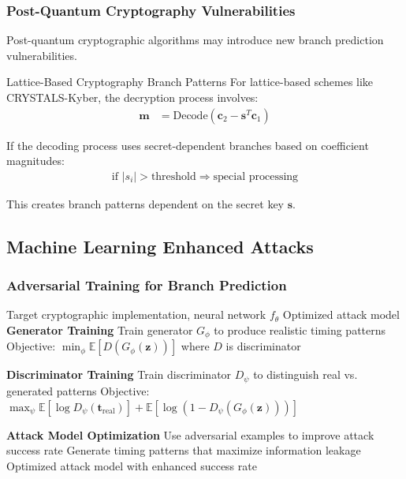 \documentclass[11pt,a4paper]{article}
\theoremstyle{definition}
\begin{document}
\subsubsection{Post-Quantum Cryptography Vulnerabilities}

Post-quantum cryptographic algorithms may introduce new branch prediction vulnerabilities.

\begin{mathematicsbox}{Lattice-Based Cryptography Branch Patterns}
For lattice-based schemes like CRYSTALS-Kyber, the decryption process involves:
\begin{align}
\mathbf{m} &= \text{Decode}(\mathbf{c}_2 - \mathbf{s}^T \mathbf{c}_1)
\end{align}

If the decoding process uses secret-dependent branches based on coefficient magnitudes:
\begin{align}
\text{if } |s_i| > \text{threshold} \Rightarrow \text{special processing}
\end{align}

This creates branch patterns dependent on the secret key $\mathbf{s}$.
\end{mathematicsbox}

\subsection{Machine Learning Enhanced Attacks}

\subsubsection{Adversarial Training for Branch Prediction}

\begin{algorithm}
\caption{Adversarial Branch Pattern Learning}
\begin{algorithmic}[1]
\REQUIRE Target cryptographic implementation, neural network $f_\theta$
\ENSURE Optimized attack model
\STATE \textbf{Generator Training}
\STATE Train generator $G_\phi$ to produce realistic timing patterns
\STATE Objective: $\min_\phi \mathbb{E}[D(G_\phi(\mathbf{z}))]$ where $D$ is discriminator

\STATE \textbf{Discriminator Training}  
\STATE Train discriminator $D_\psi$ to distinguish real vs. generated patterns
\STATE Objective: $\max_\psi \mathbb{E}[\log D_\psi(\mathbf{t}_{\text{real}})] + \mathbb{E}[\log(1-D_\psi(G_\phi(\mathbf{z})))]$

\STATE \textbf{Attack Model Optimization}
\STATE Use adversarial examples to improve attack success rate
\STATE Generate timing patterns that maximize information leakage
\RETURN Optimized attack model with enhanced success rate
\end{algorithmic}
\end{algorithm}
\end{document}

